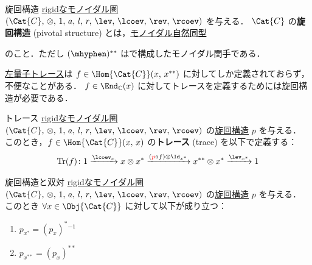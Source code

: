 \documentclass[TQFT_main]{subfiles}
\begin{document}
\begin{mydef}[label=def:pivotal,breakable]{旋回構造}
    \hyperref[redef:rigid]{rigidなモノイダル圏} $(\Cat{C},\, \otimes,\, 1,\, a,\, l,\, r,\, \lev,\, \lcoev,\, \rev,\, \rcoev)$ を与える．
    $\Cat{C}$ の\textbf{旋回構造} (pivotal structure) とは，\hyperref[def:monoidal-nat]{モノイダル自然同型}
    \begin{center}
    \end{center}
    のこと．ただし $(\mhyphen)^{**}$ はで構成したモノイダル関手である．
\end{mydef}

\hyperref[def:qtrace]{左量子トレース}は $f \in \Hom{\Cat{C}}(x,\, x^{**})$ に対してしか定義されておらず，不便なことがある．
$f \in \End_{\mathbb{C}} (x)$ に対してトレースを定義するためには旋回構造が必要である．

\begin{mydef}[label=def:trace]{トレース}
    \hyperref[redef:rigid]{rigidなモノイダル圏} $(\Cat{C},\, \otimes,\, 1,\, a,\, l,\, r,\, \lev,\, \lcoev,\, \rev,\, \rcoev)$ の\hyperref[def:pivotal]{旋回構造} $p$ を与える．
    このとき，$f \in \Hom{\Cat{C}}(x,\, x)$ の\textbf{トレース} (trace) を以下で定義する：
    \begin{align}
        \Tr (f) \colon 1 \xrightarrow{\lcoev_x} x \otimes x^* \xrightarrow{(\textcolor{red}{p}\circ f) \otimes \Id_{x^*}} x^{**} \otimes x^* \xrightarrow{\lev_{x^*}} 1
    \end{align}
\end{mydef}

\begin{mylem}[label=lem:pivotal]{旋回構造と双対}
    \hyperref[redef:rigid]{rigidなモノイダル圏} $(\Cat{C},\, \otimes,\, 1,\, a,\, l,\, r,\, \lev,\, \lcoev,\, \rev,\, \rcoev)$ の\hyperref[def:pivotal]{旋回構造} $p$ を与える．
    このとき $\forall x \in \Obj{\Cat{C}}$ に対して以下が成り立つ：
    \begin{enumerate}
        \item $p_{x^*} = (p_x)^{*}{}^{-1}$
        \item $p_{x^{**}} = (p_x)^{**}$
    \end{enumerate}
\end{mylem}
\end{document}
